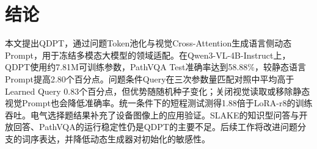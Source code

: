 \section{结论}

本文提出QDPT，通过问题Token池化与视觉Cross-Attention生成语言侧动态Prompt，用于冻结多模态大模型的领域适配。在Qwen3-VL-4B-Instruct上，QDPT使用约7.81M可训练参数，PathVQA Test准确率达到58.88\%，较静态语言Prompt提高2.80个百分点。问题条件Query在三次参数量匹配对照中平均高于Learned Query 0.83个百分点，但优势随随机种子变化；关闭视觉读取或移除静态视觉Prompt也会降低准确率。统一条件下的短程测试测得1.88倍于LoRA-r8的训练吞吐。电气选择题结果补充了设备图像上的应用验证。SLAKE的知识型问答与开放回答、PathVQA的运行稳定性仍是QDPT的主要不足。后续工作将改进问题分支的词序表达，并降低动态生成器对初始化的敏感性。
